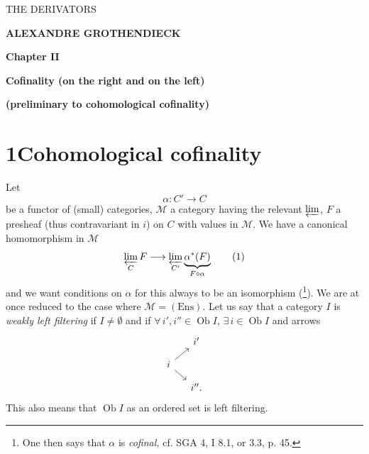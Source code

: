 \printedpage{--}

\begin{center}
\vspace*{4cm}
{\Large\textsf{THE DERIVATORS}}

\bigskip\bigskip

\textbf{ALEXANDRE GROTHENDIECK}

\bigskip\bigskip\bigskip

\textbf{Chapter II}

\textbf{Cofinality (on the right and on the left)}

\textbf{(preliminary to cohomological cofinality)}
\end{center}

\clearpage

\printedpage{--}

\vspace*{6cm}


\clearpage



\section*{1\quad Cohomological cofinality}

Let
\[ \alpha : C' \longrightarrow C \]
be a functor of (small) categories, $\mathcal{M}$ a category having the relevant $\varprojlim$, $F$ a presheaf (thus contravariant in $i$) on $C$ with values in $\mathcal{M}$. We have a canonical homomorphism in $\mathcal{M}$
\[ \varprojlim_{C} F \longrightarrow \varprojlim_{C'} \underbrace{\alpha^*(F)}_{F\circ\alpha} \tag*{(1)} \]
and we want conditions on $\alpha$ for this always to be an isomorphism (\footnote{One then says that $\alpha$ is \textit{cofinal,} cf. SGA 4, I 8.1, or 3.3, p. 45.}). We are at once reduced to the case where $\mathcal{M} = (\mathrm{Ens})$. Let us say that a category $I$ is \textit{weakly left filtering} if $I \neq \emptyset$ and if $\forall\, i', i'' \in \operatorname{Ob} I$, $\exists\, i \in \operatorname{Ob} I$ and arrows
\[
\begin{tikzcd}[row sep=small, column sep=small]
 & i' \\
i \arrow[ur] \arrow[dr] & \\
 & i''.
\end{tikzcd}
\]
This also means that $\operatorname{Ob} I$ as an ordered set is left filtering.

